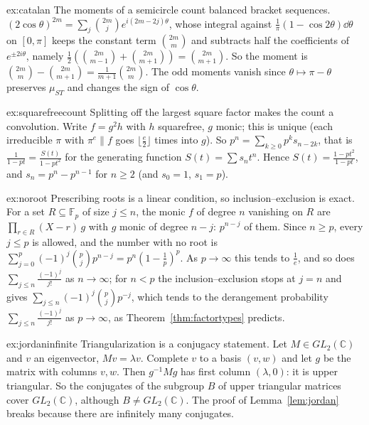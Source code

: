 \begin{solution}{ex:catalan}
\idea The moments of a semicircle count balanced bracket sequences.
\writeup $(2\cos\theta)^{2m}=\sum_j\binom{2m}je^{i(2m-2j)\theta}$, whose integral against $\frac1\pi(1-\cos2\theta)\dd\theta$ on $[0,\pi]$ keeps the constant term $\binom{2m}m$ and subtracts half the coefficients of $e^{\pm2i\theta}$, namely $\frac12(\binom{2m}{m-1}+\binom{2m}{m+1})=\binom{2m}{m+1}$. So the moment is $\binom{2m}m-\binom{2m}{m+1}=\frac1{m+1}\binom{2m}m$. The odd moments vanish since $\theta\mapsto\pi-\theta$ preserves $\mu_{ST}$ and changes the sign of $\cos\theta$.
\end{solution}

\begin{solution}{ex:squarefreecount}
\idea Splitting off the largest square factor makes the count a convolution.
\writeup Write $f=g^2h$ with $h$ squarefree, $g$ monic; this is unique (each irreducible $\pi$ with $\pi^e\| f$ goes $\lfloor\frac e2\rfloor$ times into $g$). So $p^n=\sum_{k\ge0}p^ks_{n-2k}$, that is $\frac1{1-pt}=\frac{S(t)}{1-pt^2}$ for the generating function $S(t)=\sum s_nt^n$. Hence $S(t)=\frac{1-pt^2}{1-pt}$, and $s_n=p^n-p^{n-1}$ for $n\ge2$ (and $s_0=1$, $s_1=p$).
\end{solution}

\begin{solution}{ex:noroot}
\idea Prescribing roots is a linear condition, so inclusion--exclusion is exact.
\writeup For a set $R\subseteq\mathbb F_p$ of size $j\le n$, the monic $f$ of degree $n$ vanishing on $R$ are $\prod_{r\in R}(X-r)\,g$ with $g$ monic of degree $n-j$: $p^{n-j}$ of them. Since $n\ge p$, every $j\le p$ is allowed, and the number with no root is $\sum_{j=0}^p(-1)^j\binom pjp^{n-j}=p^n(1-\frac1p)^p$. As $p\to\infty$ this tends to $\frac1e$, and so does $\sum_{j\le n}\frac{(-1)^j}{j!}$ as $n\to\infty$; for $n<p$ the inclusion--exclusion stops at $j=n$ and gives $\sum_{j\le n}(-1)^j\binom pjp^{-j}$, which tends to the derangement probability $\sum_{j\le n}\frac{(-1)^j}{j!}$ as $p\to\infty$, as Theorem~\ref{thm:factortypes} predicts.
\end{solution}

\begin{solution}{ex:jordaninfinite}
\idea Triangularization is a conjugacy statement.
\writeup Let $M\in GL_2(\mathbb C)$ and $v$ an eigenvector, $Mv=\lambda v$. Complete $v$ to a basis $(v,w)$ and let $g$ be the matrix with columns $v,w$. Then $g^{-1}Mg$ has first column $(\lambda,0)$: it is upper triangular. So the conjugates of the subgroup $B$ of upper triangular matrices cover $GL_2(\mathbb C)$, although $B\ne GL_2(\mathbb C)$. The proof of Lemma~\ref{lem:jordan} breaks because there are infinitely many conjugates.
\end{solution}

